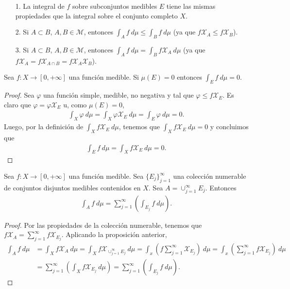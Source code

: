 \begin{obs}
\begin{enumerate}
    \item[1.] La integral de $f$ sobre subconjuntos medibles $E$ tiene las mismas propiedades que la integral sobre el conjunto completo $X$.
    \item[2.] Si $A \subset B$, $A,B \in \mathcal{M}$, entonces $\int_{A}{f \ d\mu} \leq \int_{B}{f \ d\mu}$ (ya que $f\mathcal{X}_A \leq f\mathcal{X}_B$).
    \item[3.] Si $A \subset B$, $A,B \in \mathcal{M}$, entonces $\int_{A}{f \ d\mu} = \int_{B}{f \mathcal{X}_A \ d\mu}$ (ya que $f\mathcal{X}_A = f\mathcal{X}_{A \cap B} = f\mathcal{X}_A\mathcal{X}_B$).
\end{enumerate}
\end{obs}
\begin{prop}
Sea $f: X \longrightarrow [0,+\infty]$ una función medible. Si $\mu(E) = 0$ entonces $\int_{E}{f \ d\mu} = 0$.
\end{prop}

\begin{proof}
Sea $\varphi$ una función simple, medible, no negativa y tal que $\varphi \leq f\mathcal{X}_E$. Es claro que $\varphi = \varphi\mathcal{X}_E$ u, como $\mu(E) = 0$,
\begin{align*}
    \int_{X}{\varphi \ d\mu} = \int_{X}{\varphi\mathcal{X}_E \ d\mu} = \int_{E}{\varphi \ d\mu} = 0.
\end{align*}
Luego, por la definición de $\int_{X}{f \mathcal{X}_E \ d\mu}$, tenemos que $\int_{X}{f\mathcal{X}_E \ d\mu} = 0$ y concluimos que
\begin{align*}
    \int_{E}{f \ d\mu} = \int_{X}{f\mathcal{X}_E \ d\mu} = 0.
\end{align*}
\end{proof}

\begin{prop}
Sea $f: X \longrightarrow [0,+\infty]$ una función medible. Sea $\{ E_j\}_{j=1}^{\infty}$ una colección numerable de conjuntos disjuntos medibles contenidos en $X$. Sea $A = \cup_{j=1}^{\infty}{E_j}$. Entonces
\begin{align*}
    \int_{A}{f \ d\mu} = \sum_{j=1}^{\infty}{\left( \int_{E_j}{f \ d\mu}\right)}.
\end{align*}
\end{prop}

\begin{proof}
Por las propiedades de la colección numerable, tenemos que $f\mathcal{X}_A = \sum_{j=1}^{\infty}{f\mathcal{X}_{E_j}}$. Aplicando la proposición anterior,
\begin{align*}
    \int_{A}{f \ d\mu} &= \int_{X}{f\mathcal{X}_A \ d\mu} = \int_{X}{f\mathcal{X}_{\cup_{j=1}^{\infty}{E_j}} \ d\mu} = \int_{x}{\left(f\sum_{j=1}^{\infty}{\mathcal{X}_{E_j}}\right) \ d\mu} = \int_{x}{\left(\sum_{j=1}^{\infty}{f\mathcal{X}_{E_j}}\right) \ d\mu}\\
    &= \sum_{j=1}^{\infty}{\left( \int_{X}{f\mathcal{X}_{E_j} \ d\mu}\right)} = \sum_{j=1}^{\infty}{\left( \int_{E_j}{f \ d\mu}\right)}.
\end{align*}
\end{proof}

